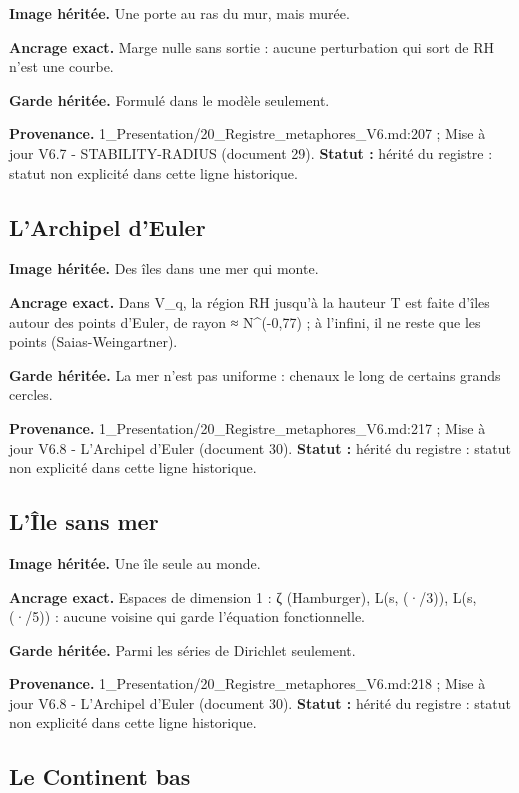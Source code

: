 \documentclass[
  9pt,
  a4paper,
]{article}
\begin{document}
\textbf{Image héritée.} Une porte au ras du mur, mais murée.

\textbf{Ancrage exact.} Marge nulle sans sortie : aucune perturbation
qui sort de RH n'est une courbe.

\textbf{Garde héritée.} Formulé dans le modèle seulement.

\textbf{Provenance.} 1\_Presentation/20\_Registre\_metaphores\_V6.md:207
; Mise à jour V6.7 - STABILITY-RADIUS (document 29). \textbf{Statut :}
hérité du registre : statut non explicité dans cette ligne historique.

\hypertarget{larchipel-deuler}{%
\subsection{L'Archipel d'Euler}\label{larchipel-deuler}}

\textbf{Image héritée.} Des îles dans une mer qui monte.

\textbf{Ancrage exact.} Dans V\_q, la région RH jusqu'à la hauteur T est
faite d'îles autour des points d'Euler, de rayon ≈ N\^{}(-0,77) ; à
l'infini, il ne reste que les points (Saias-Weingartner).

\textbf{Garde héritée.} La mer n'est pas uniforme : chenaux le long de
certains grands cercles.

\textbf{Provenance.} 1\_Presentation/20\_Registre\_metaphores\_V6.md:217
; Mise à jour V6.8 - L'Archipel d'Euler (document 30). \textbf{Statut :}
hérité du registre : statut non explicité dans cette ligne historique.

\hypertarget{luxeele-sans-mer}{%
\subsection{L'Île sans mer}\label{luxeele-sans-mer}}

\textbf{Image héritée.} Une île seule au monde.

\textbf{Ancrage exact.} Espaces de dimension 1 : ζ (Hamburger), L(s,
(·/3)), L(s, (·/5)) : aucune voisine qui garde l'équation fonctionnelle.

\textbf{Garde héritée.} Parmi les séries de Dirichlet seulement.

\textbf{Provenance.} 1\_Presentation/20\_Registre\_metaphores\_V6.md:218
; Mise à jour V6.8 - L'Archipel d'Euler (document 30). \textbf{Statut :}
hérité du registre : statut non explicité dans cette ligne historique.

\hypertarget{le-continent-bas}{%
\subsection{Le Continent bas}\label{le-continent-bas}}
\end{document}

